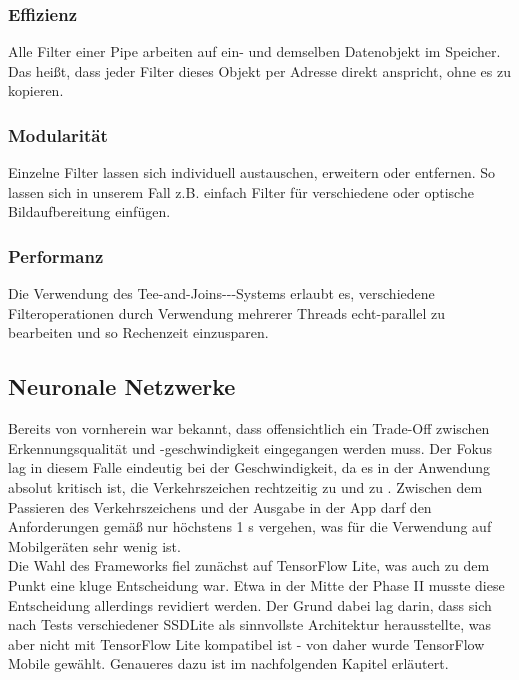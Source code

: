 \documentclass[12pt,a4paper,ngerman,enabledeprecatedfontcommands]{scrreprt}
\begin{document}
\subsubsection{Effizienz}
Alle \gls{Filter} einer \gls{Pipe} arbeiten auf ein- und demselben Datenobjekt im Speicher. Das heißt, dass jeder \gls{Filter} dieses Objekt per Adresse direkt anspricht, ohne es zu  kopieren. 

\subsubsection{Modularität}
Einzelne \gls{Filter} lassen sich individuell austauschen, erweitern oder entfernen. So lassen sich in unserem Fall z.B. einfach \gls{Filter} für verschiedene  oder optische Bildaufbereitung einfügen.

\subsubsection{Performanz}
Die Verwendung des \glqq{}Tee-and-Joins---Systems\grqq{} erlaubt es, verschiedene Filteroperationen durch Verwendung mehrerer Threads echt-parallel zu bearbeiten und so Rechenzeit einzusparen.\\

\subsection{Neuronale Netzwerke}
Bereits von vornherein war bekannt, dass offensichtlich ein Trade-Off zwischen Erkennungsqualität und -geschwindigkeit eingegangen werden muss. Der Fokus lag in diesem Falle eindeutig bei der Geschwindigkeit, da es in der Anwendung absolut kritisch ist, die Verkehrszeichen rechtzeitig zu  und zu . Zwischen dem Passieren des Verkehrszeichens und der Ausgabe in der \gls{App} darf den Anforderungen gemäß nur höchstens 1 s vergehen, was für die Verwendung  auf Mobilgeräten sehr wenig ist.\\
Die Wahl des Frameworks fiel zunächst auf \gls{TensorFlow Lite}, was auch zu dem Punkt eine kluge Entscheidung war. Etwa in der Mitte der Phase II musste diese Entscheidung allerdings revidiert werden. Der Grund dabei lag darin, dass sich nach Tests verschiedener  SSDLite\cite{DBLP:journals/corr/abs-1801-04381} als sinnvollste Architektur herausstellte, was aber nicht mit \gls{TensorFlow Lite} kompatibel ist - von daher wurde \gls{TensorFlow Mobile} gewählt. Genaueres dazu ist im nachfolgenden Kapitel erläutert.\\
\end{document}
